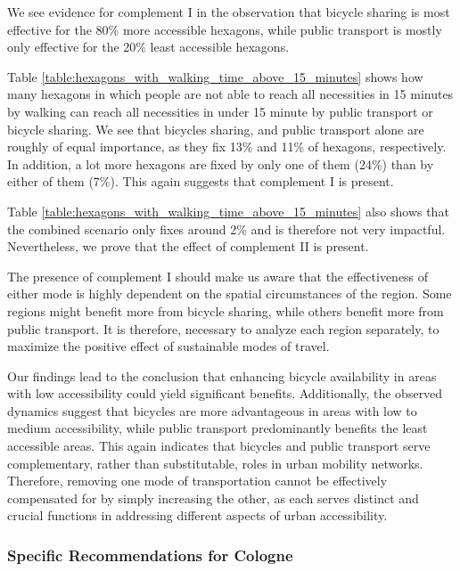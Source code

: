 We see evidence for complement I in the observation that bicycle sharing is most effective for the 80\% more accessible hexagons, while public transport is mostly only effective for the 20\% least accessible hexagons.

Table \ref{table:hexagons_with_walking_time_above_15_minutes} shows how many hexagons in which people are not able to reach all necessities in 15 minutes by walking can reach all necessities in under 15 minute by public transport or bicycle sharing.
We see that bicycles sharing, and public transport alone are roughly of equal importance, as they fix 13\% and 11\% of hexagons, respectively.
In addition, a lot more hexagons are fixed by only one of them (24\%) than by either of them (7\%).
This again suggests that complement I is present.


Table \ref{table:hexagons_with_walking_time_above_15_minutes} also shows that the combined scenario only fixes around 2\% and is therefore not very impactful.
Nevertheless, we prove that the effect of complement II is present.

The presence of complement I should make us aware that the effectiveness of either mode is highly dependent on the spatial circumstances of the region.
Some regions might benefit more from bicycle sharing, while others benefit more from public transport.
It is therefore, necessary to analyze each region separately, to maximize the positive effect of sustainable modes of travel.

Our findings lead to the conclusion that enhancing bicycle availability in areas with low accessibility could yield significant benefits.
Additionally, the observed dynamics suggest that bicycles are more advantageous in areas with low to medium accessibility, while public transport predominantly benefits the least accessible areas.
This again indicates that bicycles and public transport serve complementary, rather than substitutable, roles in urban mobility networks.
Therefore, removing one mode of transportation cannot be effectively compensated for by simply increasing the other, as each serves distinct and crucial functions in addressing different aspects of urban accessibility.


\subsubsection{Specific Recommendations for Cologne}

